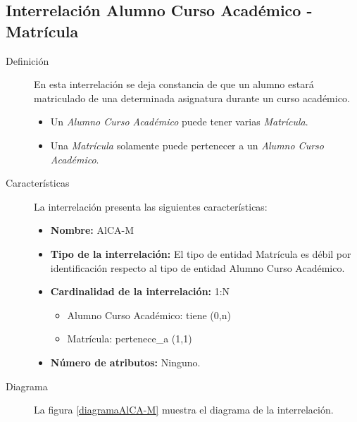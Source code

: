 \subsection{Interrelación Alumno Curso Académico - Matrícula}

   \begin{description}
      \item[Definición] En esta interrelación se deja constancia de que un
      alumno estará matriculado de una determinada asignatura durante un curso
      académico.

      \begin{itemize}
       \item Un \textit{Alumno Curso Académico} puede tener varias
             \textit{Matrícula}.
       \item Una \textit{Matrícula} solamente puede pertenecer a un
             \textit{Alumno Curso Académico}.
      \end{itemize}

      \item[Características] La interrelación presenta las siguientes
                             características:

         \begin{itemize}
            \item \textbf{Nombre:} AlCA-M
            \item \textbf{Tipo de la interrelación:} El tipo de entidad
                  Matrícula es débil por identificación respecto al tipo de
                  entidad Alumno Curso Académico.
            \item \textbf{Cardinalidad de la interrelación:} 1:N
                  \begin{itemize}
                     \item Alumno Curso Académico: tiene (0,n)
                     \item Matrícula: pertenece\_a (1,1)
                  \end{itemize}
            \item \textbf{Número de atributos:} Ninguno.
         \end{itemize}

      \item[Diagrama] La figura \ref{diagramaAlCA-M} muestra el diagrama de la
                      interrelación.


\end{description}
